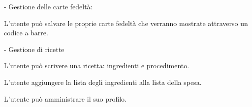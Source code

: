 \documentclass[a4paper,12pt]{article}
\begin{document}
- Gestione delle carte fedeltà:

L’utente può salvare le proprie carte fedeltà che verranno mostrate attraverso un codice a barre.

- Gestione di ricette

L’utente può scrivere una ricetta: ingredienti e procedimento.

L’utente aggiungere la lista degli ingredienti alla lista della spesa.

L’utente può amministrare il suo profilo.






 
\end{document}
